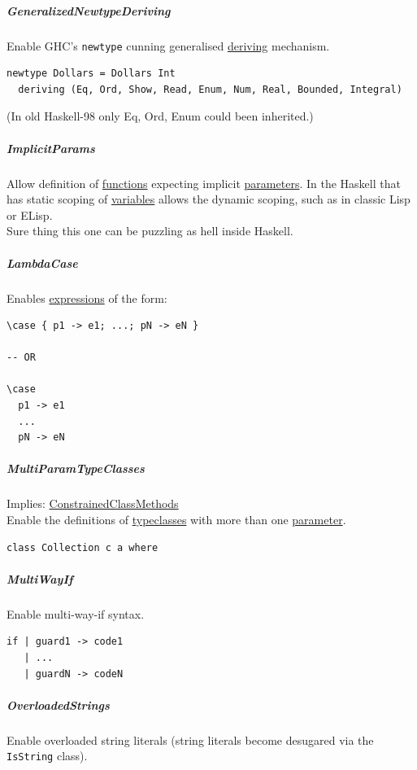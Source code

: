 \documentclass[11pt]{article}
\begin{document}
\subparagraph{\label{orgefdfade}GeneralizedNewtypeDeriving}
\label{sec:org6c5ce45}
Enable GHC’s \texttt{newtype} cunning generalised \hyperref[orgdecadd4]{deriving} mechanism.\\
\begin{verbatim}
newtype Dollars = Dollars Int
  deriving (Eq, Ord, Show, Read, Enum, Num, Real, Bounded, Integral)
\end{verbatim}
(In old Haskell-98 only Eq, Ord, Enum could been inherited.)\\

\subparagraph{\label{org70200e2}ImplicitParams}
\label{sec:org2d33799}
Allow definition of \hyperref[org66c5288]{functions} expecting implicit \hyperref[orgbeb3b81]{parameters}. In the Haskell that has static scoping of \hyperref[orgd3f3ade]{variables} allows the dynamic scoping, such as in classic Lisp or ELisp.\\
Sure thing this one can be puzzling as hell inside Haskell.\\

\subparagraph{\label{orgb78fbb0}LambdaCase}
\label{sec:org745d53b}
Enables \hyperref[org9eb2c72]{expressions} of the form:\\
\begin{verbatim}
\case { p1 -> e1; ...; pN -> eN }

-- OR

\case
  p1 -> e1
  ...
  pN -> eN
\end{verbatim}

\subparagraph{\label{orga175126}MultiParamTypeClasses}
\label{sec:org528e282}
Implies: \hyperref[orgdeed1b8]{ConstrainedClassMethods}\\
Enable the definitions of \hyperref[org26684a8]{typeclasses} with more than one \hyperref[org45d4a16]{parameter}.\\
\begin{verbatim}
class Collection c a where
\end{verbatim}

\subparagraph{\label{org767c806}MultiWayIf}
\label{sec:org73a61cf}
Enable multi-way-if syntax.\\
\begin{verbatim}
if | guard1 -> code1
   | ...
   | guardN -> codeN
\end{verbatim}

\subparagraph{\label{org7f16f89}OverloadedStrings}
\label{sec:orgba8abb4}
Enable overloaded string literals (string literals become desugared via the \texttt{IsString} class).\\
\end{document}
